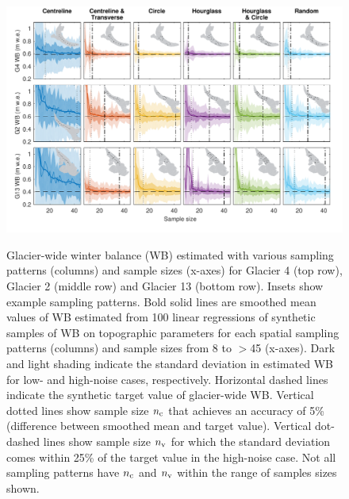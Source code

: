 \documentclass{article}
\begin{document}
\begin{figure}
	\centering
	\includegraphics[width =\textwidth]{Pulwicki_Fig3.pdf}\\
	\caption{Glacier-wide winter balance (WB) estimated with various sampling patterns (columns) and sample sizes (x-axes) for Glacier 4 (top row), Glacier 2 (middle row) and Glacier 13 (bottom row). Insets show example sampling patterns. Bold solid lines are smoothed mean values of WB estimated from 100 linear regressions of synthetic samples of WB on topographic parameters for each spatial sampling patterns (columns) and sample sizes from 8 to $>$45 (x-axes). Dark and light shading indicate the standard deviation in estimated WB for low- and high-noise cases, respectively. Horizontal dashed lines indicate the synthetic target value of glacier-wide WB. Vertical dotted lines show sample size $n_{\rm c}$ that achieves an accuracy of 5\% (difference between smoothed mean and target value). Vertical dot-dashed lines show sample size $n_{\rm v}$ for which the standard deviation comes within 25\% of the target value in the high-noise case. Not all sampling patterns have $n_{\rm c}$ and $n_{\rm v}$ within the range of samples sizes shown.}
	\label{fig:SyntheticObsWB}
\end{figure}
\end{document}
